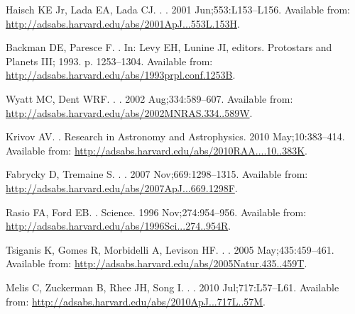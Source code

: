 \documentclass[]{rsos}
\begin{document}
\begin{thebibliography}{10}

{Haisch} KE Jr, {Lada} EA, {Lada} CJ.
.
\newblock \apjl. 2001 Jun;553:L153--L156.
\newblock Available from:
  \url{http://adsabs.harvard.edu/abs/2001ApJ...553L.153H}.

{Backman} DE, {Paresce} F.
.
\newblock In: {Levy} EH, {Lunine} JI, editors. Protostars and Planets III;
  1993. p. 1253--1304.
\newblock Available from:
  \url{http://adsabs.harvard.edu/abs/1993prpl.conf.1253B}.

{Wyatt} MC, {Dent} WRF.
.
\newblock \mnras. 2002 Aug;334:589--607.
\newblock Available from:
  \url{http://adsabs.harvard.edu/abs/2002MNRAS.334..589W}.

{Krivov} AV.
.
\newblock Research in Astronomy and Astrophysics. 2010 May;10:383--414.
\newblock Available from:
  \url{http://adsabs.harvard.edu/abs/2010RAA....10..383K}.

{Fabrycky} D, {Tremaine} S.
.
\newblock \apj. 2007 Nov;669:1298--1315.
\newblock Available from:
  \url{http://adsabs.harvard.edu/abs/2007ApJ...669.1298F}.

{Rasio} FA, {Ford} EB.
.
\newblock Science. 1996 Nov;274:954--956.
\newblock Available from:
  \url{http://adsabs.harvard.edu/abs/1996Sci...274..954R}.

{Tsiganis} K, {Gomes} R, {Morbidelli} A, {Levison} HF.
.
\newblock \nat. 2005 May;435:459--461.
\newblock Available from:
  \url{http://adsabs.harvard.edu/abs/2005Natur.435..459T}.

{Melis} C, {Zuckerman} B, {Rhee} JH, {Song} I.
.
\newblock \apjl. 2010 Jul;717:L57--L61.
\newblock Available from:
  \url{http://adsabs.harvard.edu/abs/2010ApJ...717L..57M}.


\end{thebibliography}
\end{document}
